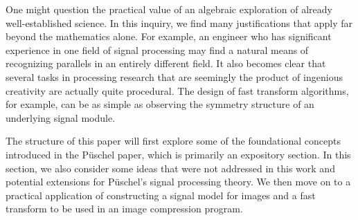 \documentclass[12pt,technote]{IEEEtran}
\begin{document}
One might question the practical value of an algebraic exploration of already well-established science. In this inquiry, we find many justifications that apply far beyond the mathematics alone. For example, an engineer who has significant experience in one field of signal processing may find a natural means of recognizing parallels in an entirely different field. It also becomes clear that several tasks in processing research that are seemingly the product of ingenious creativity are actually quite procedural. The design of fast transform algorithms, for example, can be as simple as observing the symmetry structure of an underlying signal module.

The structure of this paper will first explore some of the foundational concepts introduced in the P\"uschel paper, which is primarily an expository section. In this section, we also consider some ideas that were not addressed in this work and potential extensions for P\"uschel's signal processing theory. We then move on to a practical application of constructing a signal model for images and a fast transform to be used in an image compression program.
\end{document}
